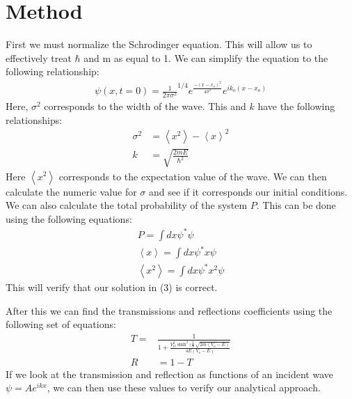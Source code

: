 \documentclass[pra,twocolumn,showpacs,amsmath,amssymb]{revtex4-2}
\begin{document}
\section{Method} \label{sec:method}

First we must normalize the Schrodinger equation. This will allow us to effectively treat $\hbar$ and m as equal to 1. We can simplify the equation to the following relationship:
\begin{align}
\psi(x,t=0) = \frac{1}{2\pi \sigma^2}^{1/4} e^{\frac{-(x-x_o)^2}{4\sigma^2}} e^{ik_o (x-x_o)}
\end{align}
Here, $\sigma^2$ corresponds to the width of the wave. This and $k$ have the following relationships:
\begin{align}
    \sigma^2 &= \left\langle x^2 \right\rangle - \left\langle x \right\rangle^2 \\
    k &= \sqrt{\frac{2mE}{\hbar^2}}
\end{align}
Here $\left\langle x^2 \right\rangle$ corresponds to the expectation value of the wave. We can then calculate the numeric value for $\sigma$ and see if it corresponds our initial conditions. We can also calculate the total probability of the system $P$. This can be done using the following equations:
\begin{align}
    P = \int dx \psi^* \psi \\
    \left\langle x \right\rangle = \int dx \psi^* x \psi\\
    \left\langle x^2 \right\rangle = \int dx \psi^* x^2 \psi
\end{align}
This will verify that our solution in (3) is correct. 
\par After this we can find the transmissions and reflections coefficients using the following set of equations:
\begin{align}
    T = &\frac{1}{1 + \frac{V_O^2 \sinh^2(\frac{L}{\hbar}\sqrt{2m(V_o - E)}}{4E(V_o - E)}} \\
    R &= 1 - T
\end{align}
If we look at the transmission and reflection as functions of an incident wave $\psi = A e^{ikx}$, we can then use these values to verify our analytical approach.
\end{document}
